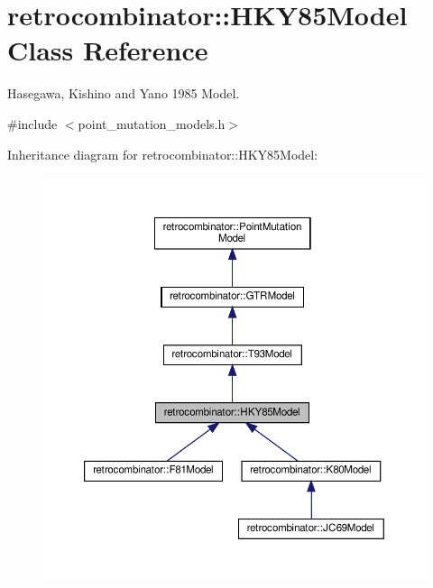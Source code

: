 \hypertarget{classretrocombinator_1_1HKY85Model}{}\section{retrocombinator\+:\+:H\+K\+Y85\+Model Class Reference}
\label{classretrocombinator_1_1HKY85Model}


Hasegawa, Kishino and Yano 1985 Model.  




{\ttfamily \#include $<$point\+\_\+mutation\+\_\+models.\+h$>$}



Inheritance diagram for retrocombinator\+:\+:H\+K\+Y85\+Model\+:\nopagebreak
\begin{figure}[H]
\begin{center}
\leavevmode
\includegraphics[width=350pt]{classretrocombinator_1_1HKY85Model__inherit__graph}
\end{center}
\end{figure}


